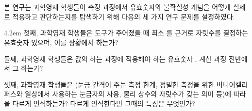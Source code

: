 \section{}

본 연구는 과학영재 학생들이 측정 과정에서 유효숫자와 불확실성 개념을
어떻게 실제로 적용하고 판단하는지를 탐색하기 위해 다음의 세 가지 연구 문제를 설정하였다.

\vspace*{20pt} \begin{hangblock}{4.2em}
첫째, 과학영재 학생들은  도구가 주어졌을 때 최소 를 근거로
자릿수를 결정하는 유효숫자  있으며,
이를  상황에서 하는가?

둘째, 과학영재 학생들은 값의 하는
 과정에 적용해야 하는
유효숫자 , 계산 과정 전반에서 그 하는가?

셋째, 과학영재 학생들은 (눈금 간격이 주는 측정 한계,
정밀한 측정을 위한 버니어캘리퍼스와 일상에서 사용하는 눈금자의 사용,
물리 상수의 자릿수가 갖는 의미 등)에 따라 을 다르게 인식하는가?
%
다르게 인식한다면 그때의 특징은 무엇인가?
\end{hangblock} \vspace*{20pt}










